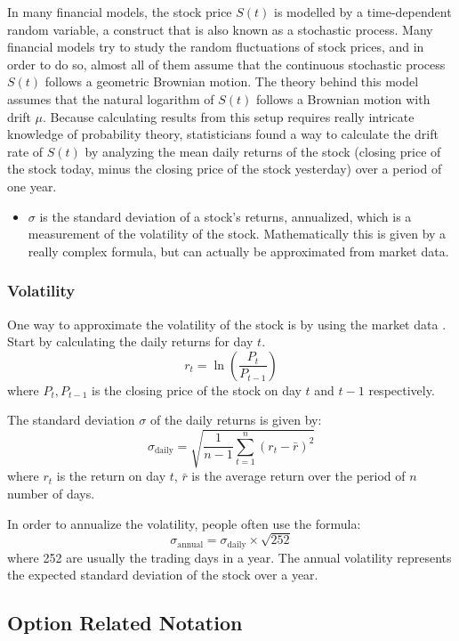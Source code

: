 \begin{remark}
	In many financial models, the stock price $S(t)$ is modelled by a time-dependent random variable, a construct that is also known as a stochastic process. Many financial models try to study the random fluctuations of stock prices, and in order to do so, almost all of them assume that the continuous stochastic process $S(t)$ follows a geometric Brownian motion.
	The theory behind this model assumes that the natural logarithm of $S(t)$ follows a Brownian motion with drift $\mu$. Because calculating results from this setup requires really intricate knowledge of probability theory, statisticians found a way to calculate the drift rate of $S(t)$ by analyzing the mean daily returns of the stock (closing price of the stock today, minus the closing price of the stock yesterday) over a period of one year.
\end{remark}

\begin{itemize}
	\item $\sigma$ is the standard deviation of a stock's returns, annualized, which is a measurement of the volatility of the stock. Mathematically this is given by a really complex formula, but can actually be approximated from market data.
\end{itemize}

\subsubsection{Volatility}
One way to approximate the volatility of the stock is by using the market data \cite{cabrera}. Start by calculating the daily returns for day $t$.
\[
	r_t = \ln \left( \frac{P_t}{P_{t-1}} \right)
\]
where $P_t, P_{t-1}$ is the closing price of the stock on day $t$ and $t-1$ respectively.

The standard deviation $\sigma$ of the daily returns is given by:
\[
	\sigma_{\text{daily}} = \sqrt{ \frac{1}{n-1} \sum_{t=1}^{n} (r_t - \bar{r})^2}
\]
where $r_t$ is the return on day $t$, $\bar{r}$ is the average return over the period of $n$ number of days.

In order to annualize the volatility, people often use the formula:
\[
	\sigma_{\text{annual}} = \sigma_{\text{daily}} \times \sqrt{252}
\]
where 252 are usually the trading days in a year. The annual volatility represents the expected standard deviation of the stock over a year.

\subsection{Option Related Notation}

